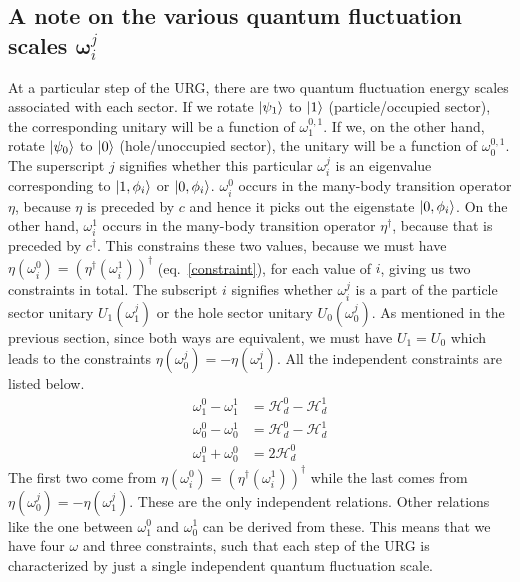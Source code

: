 \documentclass[twoside]{report}
\numberwithin{equation}{section}
\begin{document}
\subsection{A note on the various quantum fluctuation scales \(\pmb\omega_i^j\)}
At a particular step of the URG, there are two quantum fluctuation energy scales associated with each sector. If we rotate \(\ket{\psi_1}\) to \(\ket{1}\) (particle/occupied sector), the corresponding unitary will be a function of \(\omega_1^{0,1}\). If we, on the other hand, rotate \(\ket{\psi_0}\) to \(\ket{0}\) (hole/unoccupied sector), the unitary will be a function of \(\omega_0^{0,1}\). The superscript \(j\) signifies whether this particular \(\omega_i^j\) is an eigenvalue corresponding to \(\ket{1,\phi_i}\) or \(\ket{0,\phi_i}\). \(\omega^0_i\) occurs in the many-body transition operator \(\eta\), because \(\eta\) is preceded by \(c\) and hence it picks out the eigenstate \(\ket{0,\phi_i}\). On the other hand, \(\omega^1_i\) occurs in the many-body transition operator \(\eta^\dagger\), because that is preceded by \(c^\dagger\). This constrains these two values, because we must have \(\eta(\omega_i^0) = \left(\eta^\dagger(\omega_i^1)\right)^\dagger\) (eq.~\ref{constraint}), for each value of \(i\), giving us two constraints in total. The subscript \(i\) signifies whether \(\omega_i^j\) is a part of the particle sector unitary \(U_1(\omega_1^j)\) or the hole sector unitary \(U_0(\omega_0^j)\). As mentioned in the previous section, since both ways are equivalent, we must have \(U_1 = U_0\) which leads to the constraints \(\eta(\omega_0^j) = -\eta(\omega_1^j)\). All the independent constraints are listed below.
\begin{equation}\begin{aligned}
	\label{omegarel}
\omega_1^0 - \omega_1^1 &=\mathcal{H}_d^0 - \mathcal{H}_d^1\\
\omega_0^0 - \omega_0^1 &= \mathcal{H}_d^0 - \mathcal{H}_d^1\\
\omega_1^0 + \omega_0^0 &= 2\mathcal{H}_d^0
\end{aligned}\end{equation}
The first two come from \(\eta(\omega_i^0) = \left(\eta^\dagger(\omega_i^1)\right)^\dagger\) while the last comes from \(\eta(\omega_0^j) = -\eta(\omega_1^j)\). These are the only independent relations. Other relations like the one between \(\omega_1^0\) and \(\omega_0^1\) can be derived from these. This means that we have four \(\omega\) and three constraints, such that each step of the URG is characterized by just a single independent quantum fluctuation scale.
\end{document}
